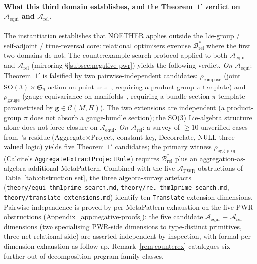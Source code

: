 \documentclass[acmsmall,screen,review]{acmart}
\begin{document}
\paragraph{What this third domain establishes, and the Theorem~$1'$ verdict on $\mathcal{A}_{\mathrm{equi}}$ and $\mathcal{A}_{\mathrm{rel}}$.}
The instantiation establishes that NOETHER applies outside the Lie-group / self-adjoint / time-reversal core: relational optimisers exercise $\mathcal{B}^{*}_{\mathrm{rel}}$ where the first two domains do not. The counterexample-search protocol applied to both $\mathcal{A}_{\mathrm{equi}}$ and $\mathcal{A}_{\mathrm{rel}}$ (mirroring \S\ref{subsec:negative-pwr}) yields the following verdict. \emph{On $\mathcal{A}_{\mathrm{equi}}$}: Theorem~$1'$ is falsified by two pairwise-independent candidates: $\rho_{\mathrm{compose}}$ (joint $\mathrm{SO}(3) \times \mathfrak{S}_n$ action on point sets~\cite{Satorras2021EGNN}, requiring a product-group $\pi$-template) and $\rho_{\mathrm{gauge}}$ (gauge-equivariance on manifolds~\cite{Cohen2019Gauge}, requiring a bundle-section $\pi$-template parametrised by $\mathbf{g} \in \mathcal{C}(M,H)$). The two extensions are independent (a product-group $\pi$ does not absorb a gauge-bundle section); the SO(3) Lie-algebra structure alone does not force closure on $\mathcal{A}_{\mathrm{equi}}$. \emph{On $\mathcal{A}_{\mathrm{rel}}$}: a survey of $\ge 10$ unverified cases from~\cite{Wang2024QED}'s residue (Aggregate$\times$Project, constant-key, Decorrelate, NULL three-valued logic) yields five Theorem~$1'$ candidates; the primary witness $\rho_{\mathrm{agg\text{-}proj}}$ (Calcite's \texttt{AggregateExtractProjectRule}) requires $\mathcal{B}^{*}_{\mathrm{rel}}$ plus an aggregation-as-algebra additional MetaPattern. Combined with the five $\mathcal{A}_{\mathrm{PWR}}$ obstructions of Table~\ref{tab:obstruction set}, the three algebra-survey artefacts (\texttt{theory/equi\_thm1prime\_search.md}, \texttt{theory/rel\_thm1prime\_search.md}, \texttt{theory/translate\_extensions.md}) identify ten \texttt{Translate}-extension dimensions. Pairwise independence is proved by per-MetaPattern exhaustion on the five PWR obstructions (Appendix~\ref{app:negative-proofs}); the five candidate $\mathcal{A}_{\mathrm{equi}}$ + $\mathcal{A}_{\mathrm{rel}}$ dimensions (two specialising PWR-side dimensions to type-distinct primitives, three net relational-side) are asserted independent by inspection, with formal per-dimension exhaustion as follow-up. Remark~\ref{rem:counterex} catalogues six further out-of-decomposition program-family classes.
\end{document}
